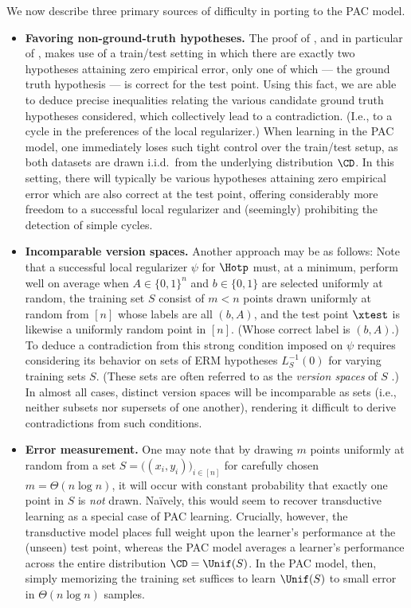 We now describe three primary sources of difficulty in porting  to the PAC model. 

\begin{itemize}
    \item \textbf{Favoring non-ground-truth hypotheses.} The proof of , and in particular of , makes use of a train/test setting in which there are exactly two hypotheses attaining zero empirical error, only one of which --- the ground truth hypothesis --- is correct for the test point. Using this fact, we are able to deduce precise inequalities relating the various candidate ground truth hypotheses considered, which collectively lead to a contradiction. (I.e., to a cycle in the preferences of the local regularizer.) When learning in the PAC model, one immediately loses such tight control over the train/test setup, as both datasets are drawn i.i.d.\ from the underlying distribution $\CD$. In this setting, there will typically be various hypotheses attaining zero empirical error which are also correct at the test point, offering considerably more freedom to a successful local regularizer and (seemingly) prohibiting the detection of simple cycles. 

    \item \textbf{Incomparable version spaces.} Another approach may be  as follows: Note that a successful local regularizer $\psi$ for $\Hotp$ must, at a minimum, perform well on average when $A \in \{0, 1\}^n$ and $b \in \{0, 1\}$ are selected uniformly at random, the training set $S$ consist of $m < n$ points drawn uniformly at random from $[n]$ whose labels are all $(b, A)$, and the test point $\xtest$ is likewise a uniformly random point in $[n]$. (Whose correct label is $(b, A)$.) To deduce a contradiction from this strong condition imposed on $\psi$ requires considering its behavior on sets of ERM hypotheses $L_{S}^{-1}(0)$ for varying training sets $S$. (These sets are often referred to as the \emph{version spaces} of $S$ \citep{mitchell1977version}.) In almost all cases, distinct version spaces will be incomparable as sets (i.e., neither subsets nor supersets of one another), rendering it difficult to derive contradictions from such conditions. 

    \item \textbf{Error measurement.} One may note that by drawing $m$ points uniformly at random from a set $S = \big((x_i, y_i) \big)_{i \in [n]}$ for carefully chosen $m = \Theta (n \log n)$, it will occur with constant probability that exactly one point in $S$ is \emph{not} drawn. Na\"ively, this would seem to recover transductive learning as a special case of PAC learning. Crucially, however, the transductive model places full weight upon the learner's performance at the (unseen) test point, whereas the PAC model averages a learner's performance across the entire distribution $\CD = \Unif(S)$. In the PAC model, then, simply memorizing the training set suffices to learn $\Unif(S)$ to small error in $\Theta(n \log n)$ samples.  
\end{itemize}
